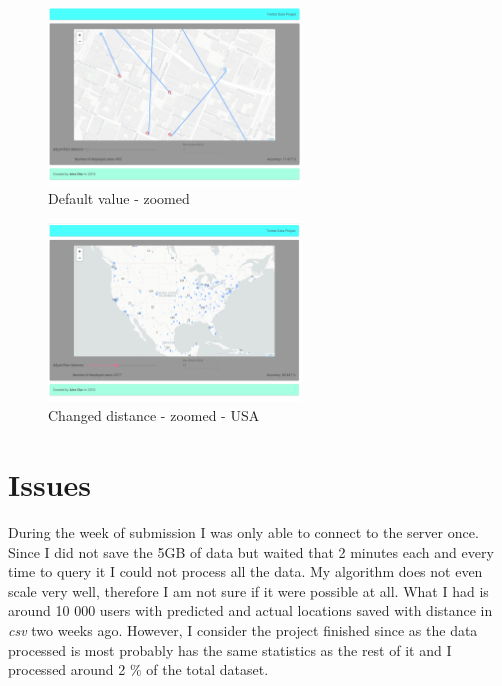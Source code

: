 \documentclass[a4paper,12pt]{article}
\begin{document}
\vspace{.2cm}

\begin{figure}[H]
	\centering
	\includegraphics[width=0.6\textwidth, height=0.35\textwidth]{./twitter2.png}
	\caption{Default value - zoomed}
\end{figure}

\vspace{.2cm}

\begin{figure}[H]
	\centering
	\includegraphics[width=0.6\textwidth, height=0.35\textwidth]{./twitter3.png}
	\caption{Changed distance - zoomed - USA}
\end{figure}

\section{Issues}

\par During the week of submission I was only able to connect to the server once.
Since I did not save the 5GB of data but waited that 2 minutes each and every time
to query it I could not process all the data. My algorithm does not even scale very
well, therefore I am not sure if it were possible at all. What I had is around 10 000
users with predicted and actual locations saved with distance in \textit{csv} two
weeks ago. However, I consider the project finished since as the data processed is
most probably has the same statistics as the rest of it and I processed around 
2 \% of the total dataset.
\end{document}
